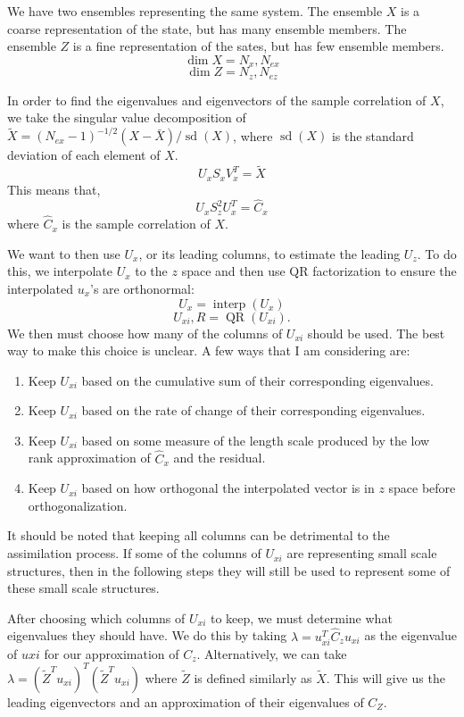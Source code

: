 \documentclass[11pt]{article} %
\DeclareMathOperator{\interp}{interp}
\DeclareMathOperator{\QR}{QR}
\DeclareMathOperator{\sd}{sd}
\begin{document}
We have two ensembles representing the same system.
The ensemble $X$ is a coarse representation of the state, but has many ensemble members.
The ensemble $Z$ is a fine representation of the sates, but has few ensemble members.
\[
\dim{X} = N_x, N_{ex}
\]
\[
\dim{Z} = N_z, N_{ez}
\]

In order to find the eigenvalues and eigenvectors of the sample correlation of $X$, we take the singular value decomposition of $\tilde{X} = {(N_{ex} - 1)}^{-1/2} (X - \bar{X})/ \sd(X)$, where $\sd(X)$ is the standard deviation of each element of $X$.
\[
U_x S_x V_x^T = \tilde{X}
\]
This means that,
\[
U_x S_z^2 U_x^T = \hat{C}_x
\]
where $\hat{C}_x$ is the sample correlation of $X$.

We want to then use $U_x$, or its leading columns, to estimate the leading $U_z$.
To do this, we interpolate $U_x$ to the $z$ space and then use QR factorization to ensure the interpolated $u_x$'s are orthonormal:
\[
U_{x} = \interp (U_x)
\]
\[
U_{xi}, R = \QR (U_{xi}).
\]
We then must choose how many of the columns of $U_{xi}$ should be used.
The best way to make this choice is unclear.
A few ways that I am considering are:
\begin{enumerate}
\item Keep $U_{xi}$ based on the cumulative sum of their corresponding eigenvalues.
\item Keep $U_{xi}$ based on the rate of change of their corresponding eigenvalues.
\item Keep $U_{xi}$ based on some measure of the length scale produced by the low rank approximation of $\hat{C}_x$ and the residual.
\item Keep $U_{xi}$ based on how orthogonal the interpolated vector is in $z$ space before orthogonalization.
\end{enumerate}
It should be noted that keeping all columns can be detrimental to the assimilation process.
If some of the columns of $U_{xi}$ are representing small scale structures, then in the following steps they will still be used to represent some of these small scale structures.

After choosing which columns of $U_{xi}$ to keep, we must determine what eigenvalues they should have.
We do this by taking $\lambda = u_{xi}^T \hat{C}_z u_{xi}$ as the eigenvalue of $u{xi}$ for our approximation of $C_z$.
Alternatively, we can take $\lambda = {(\tilde{Z}^T u_{xi})}^T (\tilde{Z}^T u_{xi})$ where $\tilde{Z}$ is defined similarly as $\tilde{X}$.
This will give us the leading eigenvectors and an approximation of their eigenvalues of $C_Z$.
\end{document}
